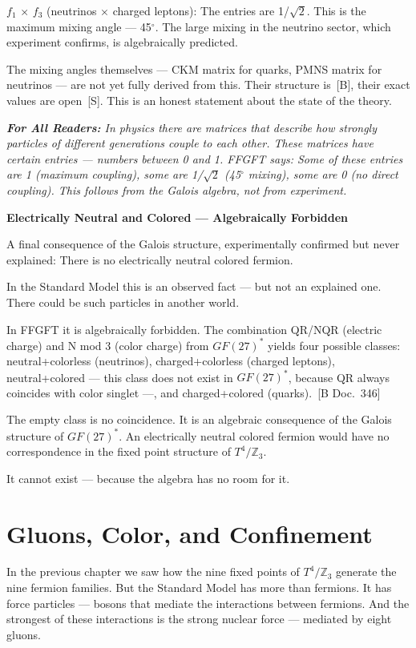 \documentclass[11pt,oneside]{book}
\newcommand{\status}[1]{\penalty10000\,{\scriptsize\textcolor{gray!60}{[#1]}}}
\newenvironment{laierspur}{%
  \par\vspace{4pt}%
  \noindent\small\itshape\color{blue!60!black}%
  \textbf{For All Readers:}\enspace\ignorespaces}{%
  \par\vspace{4pt}\normalsize\normalfont\normalcolor}
\begin{document}
$f_1$ $\times$ $f_3$ (neutrinos $\times$ charged leptons): The entries are 1/$\sqrt{2}$. This is
the maximum mixing angle — 45$^\circ$. The large mixing in the neutrino sector,
which experiment confirms, is algebraically predicted.

The mixing angles themselves — CKM matrix for quarks, PMNS matrix for
neutrinos — are not yet fully derived from this. Their structure is \status{B},
their exact values are open \status{S}. This is an honest statement about the
state of the theory.

\begin{laierspur}
In physics there are matrices that describe how strongly particles of
different generations couple to each other. These matrices have certain
entries — numbers between 0 and 1. FFGFT says: Some of these entries are 1
(maximum coupling), some are 1/$\sqrt{2}$ (45$^\circ$ mixing), some are 0 (no direct
coupling). This follows from the Galois algebra, not from experiment.
\end{laierspur}

\textbf{Electrically Neutral and Colored — Algebraically Forbidden}

A final consequence of the Galois structure, experimentally confirmed but
never explained: There is no electrically neutral colored fermion.

In the Standard Model this is an observed fact — but not an explained one.
There could be such particles in another world.

In FFGFT it is algebraically forbidden. The combination QR/NQR (electric
charge) and N mod 3 (color charge) from $GF(27)^*$ yields four possible classes:
neutral+colorless (neutrinos), charged+colorless (charged leptons),
neutral+colored — this class does not exist in $GF(27)^*$, because QR always
coincides with color singlet —, and charged+colored (quarks). \status{B Doc.~346}

The empty class is no coincidence. It is an algebraic consequence of the
Galois structure of $GF(27)^*$. An electrically neutral colored fermion would
have no correspondence in the fixed point structure of $T^4/\mathbb{Z}_3$.

It cannot exist — because the algebra has no room for it.


\chapter{Gluons, Color, and Confinement}

In the previous chapter we saw how the nine fixed points of $T^4/\mathbb{Z}_3$
generate the nine fermion families. But the Standard Model has more than
fermions. It has force particles — bosons that mediate the interactions
between fermions. And the strongest of these interactions is the strong
nuclear force — mediated by eight gluons.
\end{document}
